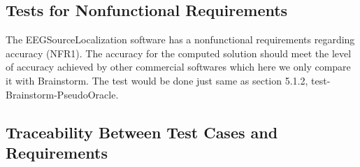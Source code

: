 \documentclass[12pt, titlepage]{article}
\renewcommand{\progname}{EEGSourceLocalization}
\begin{document}
\subsection{Tests for Nonfunctional Requirements}

The \progname{} software has a nonfunctional requirements regarding accuracy (NFR1). The accuracy for the computed solution should meet the level of accuracy achieved by other commercial softwares which here we only compare it with Brainstorm. The test would be done just same as section 5.1.2, test-Brainstorm-PseudoOracle. 

%
%
%		
%
%
%
%					
%					
%					
%					
%					
%
%					
%					
%					
%					
%
%
%

\subsection{Traceability Between Test Cases and Requirements}
\end{document}
